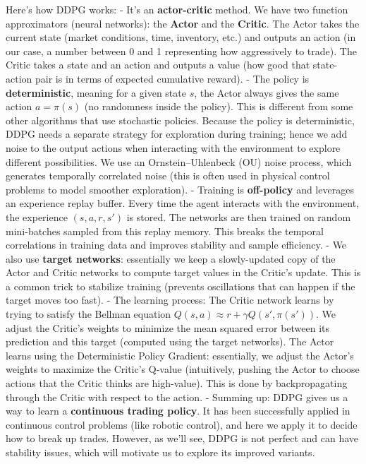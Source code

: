 \documentclass[11pt]{article}
\begin{document}
	Here’s how DDPG works:
	- It’s an \textbf{actor-critic} method. We have two function approximators (neural networks): the \textbf{Actor} and the \textbf{Critic}. The Actor takes the current state (market conditions, time, inventory, etc.) and outputs an action (in our case, a number between 0 and 1 representing how aggressively to trade). The Critic takes a state and an action and outputs a value (how good that state-action pair is in terms of expected cumulative reward).
	- The policy is \textbf{deterministic}, meaning for a given state $s$, the Actor always gives the same action $a = \pi(s)$ (no randomness inside the policy). This is different from some other algorithms that use stochastic policies. Because the policy is deterministic, DDPG needs a separate strategy for exploration during training; hence we add noise to the output actions when interacting with the environment to explore different possibilities. We use an Ornstein–Uhlenbeck (OU) noise process, which generates temporally correlated noise (this is often used in physical control problems to model smoother exploration).
	- Training is \textbf{off-policy} and leverages an experience replay buffer. Every time the agent interacts with the environment, the experience $(s, a, r, s')$ is stored. The networks are then trained on random mini-batches sampled from this replay memory. This breaks the temporal correlations in training data and improves stability and sample efficiency.
	- We also use \textbf{target networks}: essentially we keep a slowly-updated copy of the Actor and Critic networks to compute target values in the Critic’s update. This is a common trick to stabilize training (prevents oscillations that can happen if the target moves too fast).
	- The learning process: The Critic network learns by trying to satisfy the Bellman equation $Q(s,a) \approx r + \gamma Q(s',\pi(s'))$. We adjust the Critic’s weights to minimize the mean squared error between its prediction and this target (computed using the target networks). The Actor learns using the Deterministic Policy Gradient: essentially, we adjust the Actor’s weights to maximize the Critic’s Q-value (intuitively, pushing the Actor to choose actions that the Critic thinks are high-value). This is done by backpropagating through the Critic with respect to the action.
	- Summing up: DDPG gives us a way to learn a \textbf{continuous trading policy}. It has been successfully applied in continuous control problems (like robotic control), and here we apply it to decide how to break up trades. However, as we’ll see, DDPG is not perfect and can have stability issues, which will motivate us to explore its improved variants.
	
\end{document}
